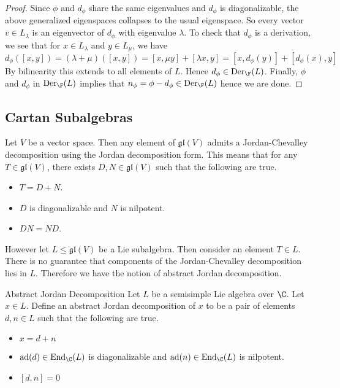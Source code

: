 \documentclass[a4paper]{article}
\begin{document}
\begin{lmm}{}{}
\begin{proof}
Since $\phi$ and $d_\phi$ share the same eigenvalues and $d_\phi$ is diagonalizable, the above generalized eigenspaces collapses to the usual eigenspace. So every vector $v\in L_\lambda$ is an eigenvector of $d_\phi$ with eigenvalue $\lambda$. To check that $d_\phi$ is a derivation, we see that for $x\in L_\lambda$ and $y\in L_\mu$, we have $$d_\phi([x,y])=(\lambda+\mu)([x,y])=[x,\mu y]+[\lambda x,y]=[x,d_\phi(y)]+[d_\phi(x),y]$$ By bilinearity this extends to all elements of $L$. Hence $d_\phi\in\text{Der}_\F(L)$. Finally, $\phi$ and $d_\phi$ in $\text{Der}_\F(L)$ implies that $n_\phi=\phi-d_\phi\in\text{Der}_\F(L)$ hence we are done. 
\end{proof}
\end{lmm}

\subsection{Cartan Subalgebras}
Let $V$ be a vector space. Then any element of $\mathfrak{gl}(V)$ admits a Jordan-Chevalley decomposition using the Jordan decomposition form. This means that for any $T\in\mathfrak{gl}(V)$, there exists $D,N\in\mathfrak{gl}(V)$ such that the following are true. 
\begin{itemize}
\item $T=D+N$. 
\item $D$ is diagonalizable and $N$ is nilpotent. 
\item $DN=ND$. 
\end{itemize}

However let $L\leq\mathfrak{gl}(V)$ be a Lie subalgebra. Then consider an element $T\in L$. There is no guarantee that components of the Jordan-Chevalley decomposition lies in $L$. Therefore we have the notion of abstract Jordan decomposition. 

\begin{defn}{Abstract Jordan Decomposition}{} Let $L$ be a semisimple Lie algebra over $\C$. Let $x\in L$. Define an abstract Jordan decomposition of $x$ to be a pair of elements $d,n\in L$ such that the following are true. 
\begin{itemize}
\item $x=d+n$
\item $\text{ad}(d)\in\text{End}_\C(L)$ is diagonalizable and $\text{ad}(n)\in\text{End}_\C(L)$ is nilpotent. 
\item $[d,n]=0$
\end{itemize}
\end{defn}
\end{document}
